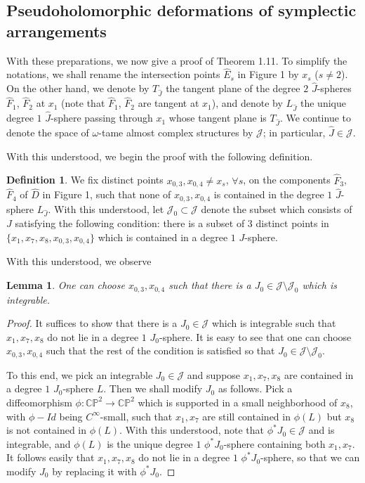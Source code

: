 \documentclass[11pt]{amsart}
\theoremstyle{plain}
\numberwithin{theorem}{section}
\newtheorem{lemma}[theorem]{Lemma}
\theoremstyle{definition}
\newtheorem{definition}[theorem]{Definition}
\newcommand{\C}{{\mathbb C}}
\renewcommand{\P}{{\mathbb P}}
\newcommand{\J}{{\mathcal J}}
\begin{document}
\subsection{Pseudoholomorphic deformations of symplectic arrangements}
With these preparations, we now give a proof of Theorem 1.11.
To simplify the notations, we shall rename the intersection points $\hat{E}_{s}$ in Figure 1 by 
$x_s$ ($s\neq 2$). On the other hand, we denote by $T_{\hat{J}}$ the tangent plane of the degree $2$ 
$\hat{J}$-spheres $\hat{F}_1$, $\hat{F}_2$ at $x_1$ (note that $\hat{F}_1$, $\hat{F}_2$ are tangent at $x_1$), and denote by $L_{\hat{J}}$ the unique degree $1$ 
$\hat{J}$-sphere passing through $x_1$ whose tangent plane is $T_{\hat{J}}$. We continue to 
denote the space of $\omega$-tame almost complex structures by $\J$; in particular, $\hat{J}\in\J$. 

With this understood, we begin the proof with the following definition. 

\begin{definition}
We fix distinct points $x_{0,3},x_{0,4}\neq x_s$, $\forall s$, on the components $\hat{F}_3$, $\hat{F}_4$ of $\hat{D}$ in Figure 1, such that none of $x_{0,3},x_{0,4}$ is contained in the degree $1$ $\hat{J}$-sphere  $L_{\hat{J}}$. With this understood, 
let $\J_0\subset \J$ denote the subset which consists of $J$ satisfying the following condition: there is a subset of $3$ distinct points in $\{x_1,x_7,x_8,x_{0,3},x_{0,4}\}$ which is contained in a degree $1$ $J$-sphere.
\end{definition}

With this understood, we observe 

\begin{lemma} 
One can choose $x_{0,3},x_{0,4}$ such that there is a $J_0\in\J\setminus \J_0$ which is integrable.
\end{lemma}

\begin{proof}
It suffices to show that there is a $J_0\in \J$ which is integrable such that $x_1,x_7,x_8$ do not lie in a
degree $1$ $J_0$-sphere. It is easy to see that one can choose $x_{0,3},x_{0,4}$ such that the rest of the condition  is satisfied so that $J_0\in\J\setminus \J_0$. 

To this end, we pick an integrable $J_0\in \J$ and suppose $x_1,x_7,x_8$ are contained in a degree $1$ 
$J_0$-sphere $L$. Then we shall modify $J_0$ as follows. Pick a diffeomorphism 
$\phi:  \C\P^2\rightarrow  \C\P^2$ which is
supported in a small neighborhood of $x_8$, with $\phi-Id$ being $C^\infty$-small, such that $x_1,x_7$ are still contained in $\phi(L)$ but $x_8$ is not contained in $\phi(L)$. With this understood, note that $\phi^\ast J_0\in
\J$ and is integrable, and $\phi(L)$ is the unique degree $1$ $\phi^\ast J_0$-sphere containing both $x_1,x_7$. 
It follows easily that $x_1,x_7,x_8$ do not lie in a degree $1$ $\phi^\ast J_0$-sphere, so that we can modify $J_0$ by replacing it with $\phi^\ast J_0$. 

\end{proof}
\end{document}

